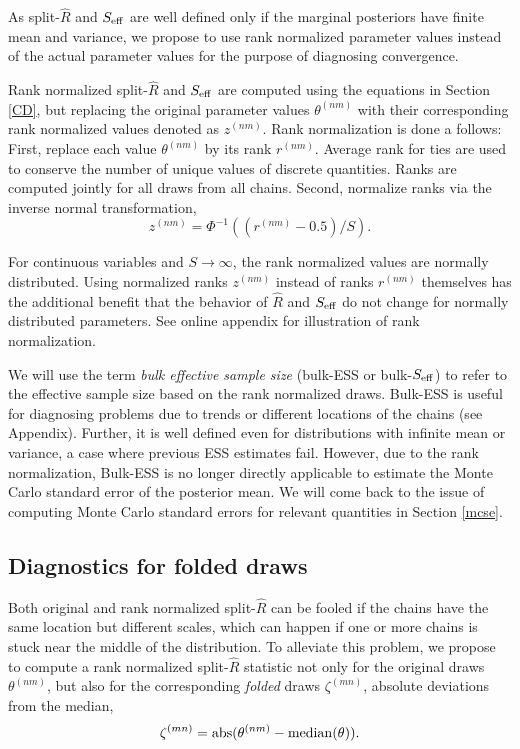 \documentclass[american,]{article}
\begin{document}
As split-\(\widehat{R}\) and \(S_{\rm eff}\) are well defined
only if the marginal posteriors have finite mean and variance, we
propose to use rank normalized parameter values instead of the actual
parameter values for the purpose of diagnosing convergence.

Rank normalized split-\(\widehat{R}\) and \(S_{\rm eff}\) are
computed using the equations in Section \ref{CD}, but
replacing the original parameter values \(\theta^{(nm)}\) with their
corresponding rank normalized values denoted as \(z^{(nm)}\). Rank
normalization is done a follows: First, replace each value
\(\theta^{(nm)}\) by its rank \(r^{(nm)}\). Average rank for ties are
used to conserve the number of unique values of discrete quantities.
Ranks are computed jointly for all draws from all chains. Second,
normalize ranks via the inverse normal transformation,
\begin{equation}
z^{(nm)} = \Phi^{-1}((r^{(nm)}-0.5)/S).
\end{equation}

For continuous variables and \(S \rightarrow \infty\), the rank
normalized values are normally distributed. Using normalized ranks
\(z^{(nm)}\) instead of ranks \(r^{(nm)}\) themselves has the additional
benefit that the behavior of \(\widehat{R}\) and \(S_{\rm eff}\) do
not change for normally distributed parameters.
See online appendix for illustration of rank normalization.

We will use the term \emph{bulk effective sample size} (bulk-ESS or
bulk-\(S_{\rm eff}\)) to refer to the effective sample size based on the
rank normalized draws. Bulk-ESS is useful for diagnosing problems due to
trends or different locations of the chains (see Appendix). Further, it is
well defined even for distributions with infinite mean or variance, a
case where previous ESS estimates fail. However, due to the rank
normalization, Bulk-ESS is no longer directly applicable to estimate the
Monte Carlo standard error of the posterior mean. We will come back to
the issue of computing Monte Carlo standard errors for relevant
quantities in Section \ref{mcse}.

\hypertarget{diagnostics-for-folded-draws}{%
\subsection{Diagnostics for folded
draws}\label{diagnostics-for-folded-draws}}

Both original and rank normalized split-\(\widehat{R}\) can be
fooled if the chains have the same location but different scales, which can happen if one or more chains is stuck near the middle of the distribution. To alleviate this problem, we propose to compute a
rank normalized split-\(\widehat{R}\) statistic not only for the
original draws \(\theta^{(nm)}\), but also for the corresponding {\em folded}
draws \(\zeta^{(mn)}\), absolute deviations from the median,
\begin{equation}
\label{zeta}
\zeta^{(mn)} = {\rm abs}(\theta^{(nm)}-{\rm median}(\theta)).
\end{equation}
\end{document}
